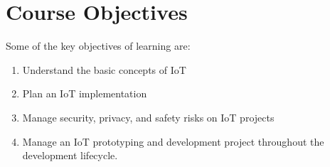 
\section{Course Objectives}
Some of the key objectives of learning \courseTitle are:
\begin{enumerate}
  \item Understand the basic concepts of IoT
  
  \item Plan an IoT implementation
  
  \item Manage security, privacy, and safety risks on IoT projects
  
  \item Manage an IoT prototyping and development project throughout the development lifecycle.
\end{enumerate}